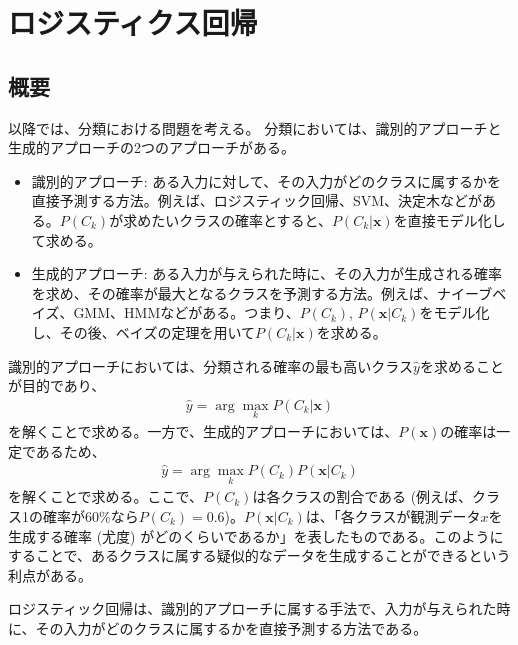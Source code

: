 \documentclass{ltjsarticle}
\begin{document}
\newpage

\section{ロジスティクス回帰}
\subsection{概要}
以降では、分類における問題を考える。
分類においては、識別的アプローチと生成的アプローチの2つのアプローチがある。
\begin{itemize}
  \item 識別的アプローチ: ある入力に対して、その入力がどのクラスに属するかを直接予測する方法。例えば、ロジスティック回帰、SVM、決定木などがある。$P(C_k)$が求めたいクラスの確率とすると、$P(C_k|\boldsymbol{x})$を直接モデル化して求める。
  \item 生成的アプローチ: ある入力が与えられた時に、その入力が生成される確率を求め、その確率が最大となるクラスを予測する方法。例えば、ナイーブベイズ、GMM、HMMなどがある。つまり、$P(C_k)$, $P(\boldsymbol{x}|C_k)$をモデル化し、その後、ベイズの定理を用いて$P(C_k|\boldsymbol{x})$を求める。
\end{itemize}
識別的アプローチにおいては、分類される確率の最も高いクラス$\hat{y}$を求めることが目的であり、
\begin{align}
  \hat{y} = \arg \max_{k} P(C_k|\boldsymbol{x})
\end{align}
を解くことで求める。一方で、生成的アプローチにおいては、$P(\boldsymbol{x})$の確率は一定であるため、
\begin{align}
  \hat{y} = \arg \max_{k} P(C_k)P(\boldsymbol{x}|C_k)
\end{align}
を解くことで求める。ここで、$P(C_k)$は各クラスの割合である (例えば、クラス1の確率が60\%なら$P(C_k)=0.6$)。$P(\boldsymbol{x}|C_k)$は、「各クラスが観測データ$x$を生成する確率 (尤度) がどのくらいであるか」を表したものである。このようにすることで、あるクラスに属する疑似的なデータを生成することができるという利点がある。

ロジスティック回帰は、識別的アプローチに属する手法で、入力が与えられた時に、その入力がどのクラスに属するかを直接予測する方法である。
\end{document}
